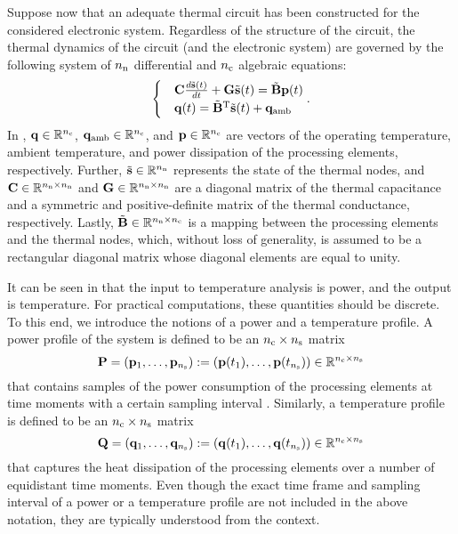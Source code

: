 Suppose now that an adequate thermal  circuit has been constructed for
the considered electronic system. Regardless of the structure of the circuit,
the thermal dynamics of the circuit (and the electronic system) are governed by
the following system of ${n_\mathrm{n}}$ differential and ${n_\mathrm{c}}$ algebraic equations:
\begin{equation} \elab{temperature-model-original}
  \begin{cases}
    & \m{C} \frac{d\tvs(t)}{dt} + \m{G} \tvs(t) = \tm{B} \vp(t) \\
    & \vq(t) = \transpose{\tm{B}} \tvs(t) + \vq_\ambient
  \end{cases}.
\end{equation}
In , $\mathbf{q} \in \mathbb{R}^{n_\mathrm{c}}$, $\mathbf{q}_{\mathrm{amb}} \in
\mathbb{R}^{n_\mathrm{c}}$, and $\mathbf{p} \in \mathbb{R}^{n_\mathrm{c}}$ are vectors of the operating temperature,
ambient temperature, and power dissipation of the processing elements,
respectively. Further, $\tilde{\mathbf{s}} \in \mathbb{R}^{n_\mathrm{n}}$ represents the state of the thermal
nodes, and $\mathbf{C} \in \mathbb{R}^{{n_\mathrm{n}} \times {n_\mathrm{n}}}$ and $\mathbf{G} \in \mathbb{R}^{{n_\mathrm{n}} \times
{n_\mathrm{n}}}$ are a diagonal matrix of the thermal capacitance and a symmetric and
positive-definite matrix of the thermal conductance, respectively. Lastly,
$\tilde{\mathbf{B}} \in \mathbb{R}^{{n_\mathrm{n}} \times {n_\mathrm{c}}}$ is a mapping between the processing elements
and the thermal nodes, which, without loss of generality, is assumed to be a
rectangular diagonal matrix whose diagonal elements are equal to unity.

It can be seen in  that the input to
temperature analysis is power, and the output is temperature. For practical
computations, these quantities should be discrete. To this end, we introduce the
notions of a power and a temperature profile. A power profile of the system is
defined to be an ${n_\mathrm{c}} \times {n_\mathrm{s}}$ matrix
\[
  \mathbf{P} = \left( \mathbf{p}_1, \dots, \mathbf{p}_{n_\mathrm{s}} \right)
  := \left( \mathbf{p}(t_1), \dots, \mathbf{p}(t_{n_\mathrm{s}}) \right) \in \mathbb{R}^{{n_\mathrm{c}} \times {n_\mathrm{s}}}
\]
that contains \ns samples of the power consumption of the \nc processing
elements at \ns time moments with a certain sampling interval \dt. Similarly, a
temperature profile is defined to be an ${n_\mathrm{c}} \times {n_\mathrm{s}}$ matrix
\[
  \mathbf{Q} = \left( \mathbf{q}_1, \dots, \mathbf{q}_{n_\mathrm{s}} \right)
  := \left( \mathbf{q}(t_1), \dots, \mathbf{q}(t_{n_\mathrm{s}}) \right) \in \mathbb{R}^{{n_\mathrm{c}} \times {n_\mathrm{s}}}
\]
that captures the heat dissipation of the processing elements over a number of
equidistant time moments. Even though the exact time frame and sampling interval
of a power or a temperature profile are not included in the above notation, they
are typically understood from the context.

